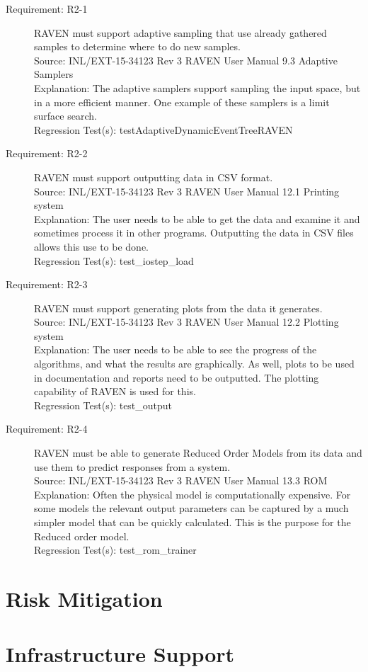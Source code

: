 \documentclass{article}
\newcommand{\requirement}[5]{\item[Requirement: #1] #2 \\Source: #3\\Explanation: #4\\Regression Test(s): #5}
\begin{document}
\begin{description}

\requirement{R2-1}{RAVEN must support adaptive sampling that use already gathered samples to determine where to do new samples.}
{INL/EXT-15-34123 Rev 3 RAVEN User Manual 9.3 Adaptive Samplers}
{The adaptive samplers support sampling the input space, but in a more efficient manner.  One example of these samplers is a limit surface search.}
{testAdaptiveDynamicEventTreeRAVEN}

\requirement{R2-2}{RAVEN must support outputting data in CSV format.}
{INL/EXT-15-34123 Rev 3 RAVEN User Manual 12.1 Printing system}
{The user needs to be able to get the data and examine it and sometimes process it in other programs.  Outputting the data in CSV files allows this use to be done.}
{test\_iostep\_load}

\requirement{R2-3}{RAVEN must support generating plots from the data it generates.}
{INL/EXT-15-34123 Rev 3 RAVEN User Manual 12.2 Plotting system}
{The user needs to be able to see the progress of the algorithms, and what the results are graphically.  As well, plots to be used in documentation and reports need to be outputted.  The plotting capability of RAVEN is used for this.}
{test\_output}

\requirement{R2-4}{RAVEN must be able to generate Reduced Order Models from its data and use them to predict responses from a system.}
{INL/EXT-15-34123 Rev 3 RAVEN User Manual 13.3 ROM}
{Often the physical model is computationally expensive.  For some models the relevant output parameters can be captured by a much simpler model that can be quickly calculated.  This is the purpose for the Reduced order model.}
{test\_rom\_trainer}

\end{description}

\section{Risk Mitigation}



\section{Infrastructure Support}
\end{document}
